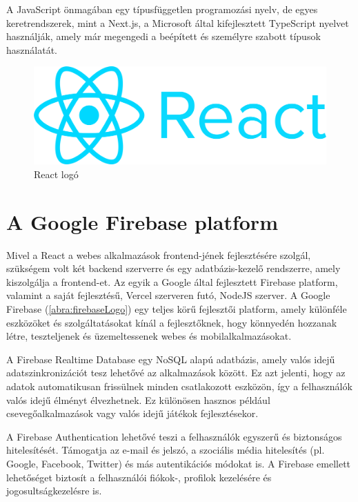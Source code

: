 A JavaScript önmagában egy típusfüggetlen programozási nyelv, de egyes keretrendszerek, mint a Next.js, a Microsoft által kifejlesztett TypeScript nyelvet használják, amely már megengedi a beépített és személyre szabott típusok használatát.

\begin{figure}[!h]
	\centering
	\includegraphics[scale=0.02]{images/reactLogo}
	\caption{React logó}
	\label{abra:reactLogo}
\end{figure}

\section {A Google Firebase platform}

Mivel a React a webes alkalmazások frontend-jének fejlesztésére szolgál, szükségem volt két backend szerverre és egy adatbázis-kezelő rendszerre, amely kiszolgálja a frontend-et. Az egyik a Google által fejlesztett Firebase platform, valamint a saját fejlesztésű, Vercel szerveren futó, NodeJS szerver. A Google Firebase (\ref{abra:firebaseLogo}) egy teljes körű fejlesztői platform, amely különféle eszközöket és szolgáltatásokat kínál a fejlesztőknek, hogy könnyedén hozzanak létre, teszteljenek és üzemeltessenek webes és mobilalkalmazásokat.

A Firebase Realtime Database egy NoSQL alapú adatbázis, amely valós idejű adatszinkronizációt tesz lehetővé az alkalmazások között. Ez azt jelenti, hogy az adatok automatikusan frissülnek minden csatlakozott eszközön, így a felhasználók valós idejű élményt élvezhetnek. Ez különösen hasznos például csevegőalkalmazások vagy valós idejű játékok fejlesztésekor. 

A Firebase Authentication lehetővé teszi a felhasználók egyszerű és biztonságos hitelesítését. Támogatja az e-mail és jelszó, a szociális média hitelesítés (pl. Google, Facebook, Twitter) és más autentikációs módokat is. A Firebase emellett lehetőséget biztosít a felhasználói fiókok-, profilok kezelésére és jogosultságkezelésre is. 

